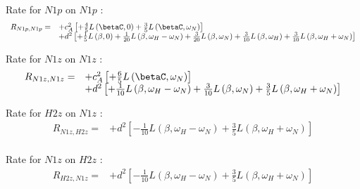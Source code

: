 \documentclass[showkeys,aps,prb,prepreint,amssymb, amsmath,nobibnotes]{article}
\begin{document}
\begin{small}

Rate for $N1p$ on $N1p$ :
\begin{equation}\begin{array}{rl}
R_{N1p,N1p}=
& + c_A^2 \left[ +\frac{4}{5} L\left(\betaC,0\right) +\frac{3}{5} L\left(\betaC,\omega_N\right)\right]\\
& + d^2 \left[ +\frac{1}{5} L\left(\beta,0\right) +\frac{1}{20} L\left(\beta,\omega_H-\omega_N\right) +\frac{3}{20} L\left(\beta,\omega_N\right) +\frac{3}{10} L\left(\beta,\omega_H\right) +\frac{3}{10} L\left(\beta,\omega_H+\omega_N\right)\right]\\
\end{array}\end{equation}
\end{small}
\begin{small}

Rate for $N1z$ on $N1z$ :
\begin{equation}\begin{array}{rl}
R_{N1z,N1z}=
& + c_A^2 \left[ +\frac{6}{5} L\left(\betaC,\omega_N\right)\right]\\
& + d^2 \left[ +\frac{1}{10} L\left(\beta,\omega_H-\omega_N\right) +\frac{3}{10} L\left(\beta,\omega_N\right) +\frac{3}{5} L\left(\beta,\omega_H+\omega_N\right)\right]\\
\end{array}\end{equation}
\end{small}
\begin{small}

Rate for $H2z$ on $N1z$ :
\begin{equation}\begin{array}{rl}
R_{N1z,H2z}=
& + d^2 \left[ -\frac{1}{10} L\left(\beta,\omega_H-\omega_N\right) +\frac{3}{5} L\left(\beta,\omega_H+\omega_N\right)\right]\\
\end{array}\end{equation}
\end{small}
\begin{small}

Rate for $N1z$ on $H2z$ :
\begin{equation}\begin{array}{rl}
R_{H2z,N1z}=
& + d^2 \left[ -\frac{1}{10} L\left(\beta,\omega_H-\omega_N\right) +\frac{3}{5} L\left(\beta,\omega_H+\omega_N\right)\right]\\
\end{array}\end{equation}
\end{small}
\end{document}
